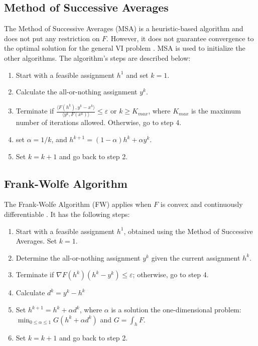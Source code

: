 \documentclass[conference]{IEEEtran}
\renewcommand{\:}{\mathrel{\coloneqq}}
\renewcommand{\=}{\ensuremath{\eqqcolon}}
\renewcommand{\epsilon}{\varepsilon}
\newcommand{\0}{\ensuremath{\boldsymbol{0}}}
\begin{document}
\subsection{Method of Successive Averages}
The Method of Successive Averages (MSA) is a heuristic-based algorithm and does not put any restriction on $F$. However, it does not guarantee convergence to the optimal solution for the general VI problem \cite{nie2010solving}. MSA is used to initialize the other algorithms. The algorithm's steps are described below:
\begin{enumerate}
    \item Start with a feasible assignment $h^1$ and set $k=1$.
    \item Calculate the all-or-nothing assignment $y^k$.
    \item Terminate if ${\frac {\langle F(h^k),y^k-x^k \rangle} {\langle y^k, F(x^k)\rangle}} \leq
    \epsilon$ or $k \geq K_{max} $, where $K_{max}$ is the maximum number of iterations allowed. Otherwise, go to step 4.
    \item set $\alpha = 1/k$, and $h^{k+1} = (1-\alpha)h^k + \alpha y^k$. 
    \item Set $k = k+1$ and go back to step 2.
\end{enumerate}

\subsection{Frank-Wolfe Algorithm}
The Frank-Wolfe Algorithm (FW) applies when $F$ is convex and continuously differentiable \cite{fukushima1984modified,gartner1977analysis}. It has the following steps:
\begin{enumerate}
\item Start with a feasible assignment $h^1$, obtained using the Method of Successive Averages. Set $k=1$.
\item Determine the all-or-nothing assignment $y^k$ given the current assignment $h^k$.
\item Terminate if $\nabla F(h^k)(h^k-y^k) \leq \epsilon$; otherwise, go to step 4.
\item Calculate $d^k = y^k - h^k$
\item Set $h^{k+1} = h^k +\alpha d^k$, where $\alpha$ is a solution the one-dimensional problem: $\min_{0 \leq \alpha \leq 1}G(h^k + \alpha d^k)$ and $G = \int_h F$.
\item Set $k = k+1$ and go back to step 2.
\end{enumerate}
\end{document}
